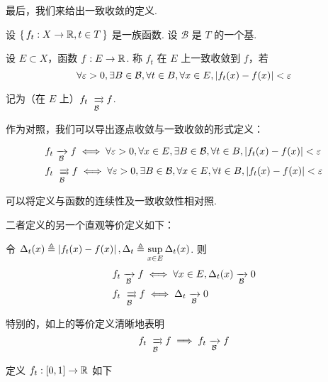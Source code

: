 最后，我们来给出一致收敛的定义.

\begin{definition}
    设 $\set{f_t:X\to\mathbb{R},t\in T}$ 是一族函数. 设 $\mathcal{B}$ 是 $T$ 的一个基.

    设 $E\subset X$，函数 $f:E\to\mathbb{R}$. 称 $f_t$ 在 $E$ 上一致收敛到 $f$，若
$$
\forall\varepsilon>0,\exists B\in\mathcal{B},\forall t\in B,\forall x\in E,\left\lvert{f_t(x)-f(x)}\right\rvert<\varepsilon
$$

    记为（在 $E$ 上）$f_t\xrightrightarrows[\mathcal{B}]{}f$.
\end{definition}

作为对照，我们可以导出逐点收敛与一致收敛的形式定义：

$$
\begin{aligned}
    &f_t\xrightarrow[\mathcal{B}]{}f\iff\forall\eps>0,\forall x\in E,\exists B\in\mathcal{B},\forall t\in B,\abs{f_t(x)-f(x)}<\eps\\
    &f_t\xrightrightarrows[\mathcal{B}]{}f\iff\forall\eps>0,\exists B\in\mathcal{B},\forall x\in E,\forall t\in B,\abs{f_t(x)-f(x)}<\eps\\
\end{aligned}
$$

\begin{hint}
    可以将定义与函数的连续性及一致收敛性相对照.
\end{hint}

二者定义的另一个直观等价定义如下：

令 $\Delta_t(x)\triangleq\left\lvert{f_t(x)-f(x)}\right\rvert,\Delta_t\triangleq\sup\limits_{x\in E}\Delta_t(x)$. 则
$$
\begin{aligned}
    &f_t\xrightarrow[\mathcal{B}]{}f\iff\forall x\in E,\Delta_t(x)\xrightarrow[\mathcal{B}]{}0\\
    &f_t\xrightrightarrows[\mathcal{B}]{}f\iff\Delta_t\xrightarrow[\mathcal{B}]{}0
\end{aligned}
$$

特别的，如上的等价定义清晰地表明
$$
f_t\xrightrightarrows[\mathcal{B}]{}f\implies f_t\xrightarrow[\mathcal{B}]{}f
$$

\begin{example}
    定义 $f_t:[0,1]\to\mathbb{R}$ 如下

    \begin{center}
    \end{center}
\end{example}

